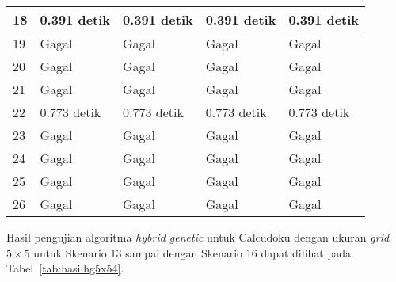 \begin{table}
\begin{tabular}{| l | l | l | l | l |}
\hline
18 & 0.391 detik & 0.391 detik & 0.391 detik & 0.391 detik \\
\hline
19 & Gagal & Gagal & Gagal & Gagal \\
\hline
20 & Gagal & Gagal & Gagal & Gagal \\
\hline
21 & Gagal & Gagal & Gagal & Gagal \\
\hline
22 & 0.773 detik & 0.773 detik & 0.773 detik & 0.773 detik \\
\hline
23 & Gagal & Gagal & Gagal & Gagal \\
\hline
24 & Gagal & Gagal & Gagal & Gagal \\
\hline
25 & Gagal & Gagal & Gagal & Gagal \\
\hline
26 & Gagal & Gagal & Gagal & Gagal \\
\hline
\end{tabular}
\label{tab:hasilhg5x53}
\end{table}

Hasil pengujian algoritma \textit{hybrid genetic} untuk Calcudoku dengan ukuran \textit{grid} \begin{math}5 \times 5\end{math} untuk Skenario 13 sampai dengan Skenario 16 dapat dilihat pada Tabel~\ref{tab:hasilhg5x54}.

